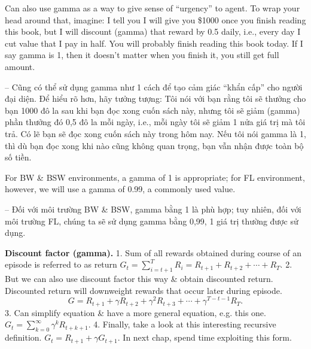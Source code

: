 \documentclass{article}
\begin{document}
\begin{itemize}
\begin{itemize}
        Can also use gamma as a way to give sense of ``urgency'' to agent. To wrap your head around that, imagine: I tell you I will give you \$1000 once you finish reading this book, but I will discount (gamma) that reward by 0.5 daily, i.e., every day I cut value that I pay in half. You will probably finish reading this book today. If I say gamma is 1, then it doesn't matter when you finish it, you still get full amount.

        -- Cũng có thể sử dụng gamma như 1 cách để tạo cảm giác ``khẩn cấp'' cho người đại diện. Để hiểu rõ hơn, hãy tưởng tượng: Tôi nói với bạn rằng tôi sẽ thưởng cho bạn 1000 đô la sau khi bạn đọc xong cuốn sách này, nhưng tôi sẽ giảm (gamma) phần thưởng đó 0,5 đô la mỗi ngày, i.e., mỗi ngày tôi sẽ giảm 1 nửa giá trị mà tôi trả. Có lẽ bạn sẽ đọc xong cuốn sách này trong hôm nay. Nếu tôi nói gamma là 1, thì dù bạn đọc xong khi nào cũng không quan trọng, bạn vẫn nhận được toàn bộ số tiền.

        For BW \& BSW environments, a gamma of 1 is appropriate; for FL environment, however, we will use a gamma of 0.99, a commonly used value.

        -- Đối với môi trường BW \& BSW, gamma bằng 1 là phù hợp; tuy nhiên, đối với môi trường FL, chúng ta sẽ sử dụng gamma bằng 0,99, 1 giá trị thường được sử dụng.

        {\bf Discount factor (gamma).} 1. Sum of all rewards obtained during course of an episode is referred to as return $G_t = \sum_{i=t+1}^T R_i = R_{t+1} + R_{t+2} + \cdots + R_T$. 2. But we can also use discount factor this way \& obtain discounted return. Discounted return will downweight rewards that occur later during episode.
        \begin{equation*}
            G = R_{t+1} + \gamma R_{t+2} + \gamma^2R_{t+3} + \cdots + \gamma^{T - t - 1}R_T.
        \end{equation*}
        3. Can simplify equation \& have a more general equation, e.g. this one. $G_t = \sum_{k=0}^\infty \gamma^kR_{t + k + 1}$. 4. Finally, take a look at this interesting recursive definition. $G_t = R_{t+1} + \gamma G_{t+1}$. In next chap, spend time exploiting this form.


\end{itemize}
\end{itemize}
\end{document}
